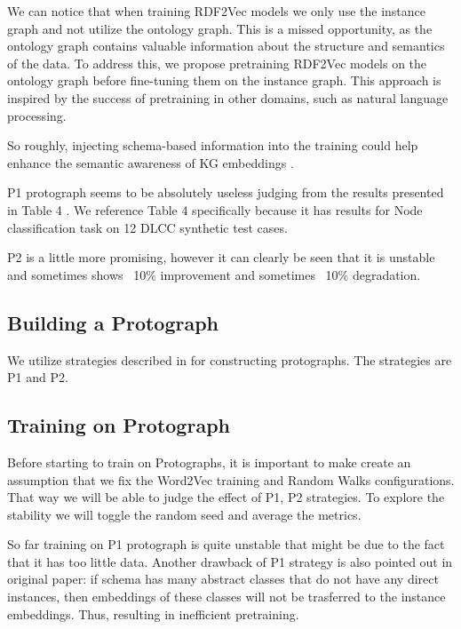 \documentclass[a4paper,oneside,bibliography=totoc]{scrartcl}
\begin{document}
We can notice that when training RDF2Vec models we only use the instance graph and not utilize the ontology graph. 
This is a missed opportunity, as the ontology graph contains valuable information about the structure and semantics of the data. 
To address this, we propose pretraining RDF2Vec models on the ontology graph before fine-tuning them on the instance graph. 
This approach is inspired by the success of pretraining in other domains, such as natural language processing. 

So roughly, injecting schema-based information into the training could help enhance the semantic awareness of KG embeddings \cite{hubert2024treatdifferentnegativesdifferently}.


P1 protograph seems to be absolutely useless judging from the results presented in Table 4 \cite{hubert2024treatdifferentnegativesdifferently}. 
We reference Table 4 specifically because it has results for Node classification task on 12 DLCC synthetic test cases. 

P2 is a little more promising, however it can clearly be seen that it is unstable and sometimes shows ~10\% improvement and sometimes ~10\% degradation.

\subsection{Building a Protograph}
We utilize strategies described in \cite{hubert2024treatdifferentnegativesdifferently} for constructing protographs. The strategies are P1 and P2. 


\subsection{Training on Protograph}

Before starting to train on Protographs, it is important to make create an assumption that we fix the Word2Vec training and Random Walks configurations.
That way we will be able to judge the effect of P1, P2 strategies. To explore the stability we will toggle the random seed and average the metrics. 


So far training on P1 protograph is quite unstable that might be due to the fact that it has too little data. Another drawback of P1 strategy is also pointed out in original paper:
if schema has many abstract classes that do not have any direct instances, then embeddings of these classes will not be trasferred to the instance embeddings. Thus, resulting in inefficient pretraining. 
\end{document}
